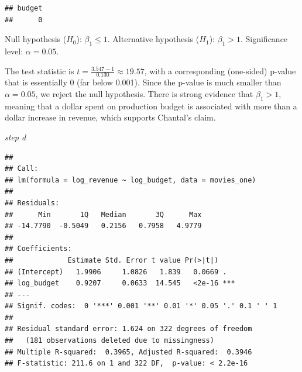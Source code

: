 \documentclass[
]{article}
\newenvironment{Shaded}{\begin{snugshade}}{\end{snugshade}}
\newcommand{\AttributeTok}[1]{\textcolor[rgb]{0.13,0.29,0.53}{#1}}
\newcommand{\CommentTok}[1]{\textcolor[rgb]{0.56,0.35,0.01}{\textit{#1}}}
\newcommand{\ConstantTok}[1]{\textcolor[rgb]{0.56,0.35,0.01}{#1}}
\newcommand{\DecValTok}[1]{\textcolor[rgb]{0.00,0.00,0.81}{#1}}
\newcommand{\FunctionTok}[1]{\textcolor[rgb]{0.13,0.29,0.53}{\textbf{#1}}}
\newcommand{\NormalTok}[1]{#1}
\newcommand{\OtherTok}[1]{\textcolor[rgb]{0.56,0.35,0.01}{#1}}
\newcommand{\SpecialCharTok}[1]{\textcolor[rgb]{0.81,0.36,0.00}{\textbf{#1}}}
\begin{document}
\begin{verbatim}
## budget 
##      0
\end{verbatim}

Null hypothesis (\(H_0\)): \(\beta_1 \leq 1\). Alternative hypothesis
(\(H_1\)): \(\beta_1 > 1\). Significance level: \(\alpha = 0.05\).

The test statistic is \(t = \frac{3.547 - 1}{0.130} \approx 19.57\),
with a corresponding (one-sided) p-value that is essentially 0 (far
below 0.001). Since the p-value is much smaller than \(\alpha = 0.05\),
we reject the null hypothesis. There is strong evidence that
\(\beta_1 > 1\), meaning that a dollar spent on production budget is
associated with more than a dollar increase in revenue, which supports
Chantal's claim.

\emph{step d}

\begin{Shaded}
\end{Shaded}

\begin{verbatim}
## 
## Call:
## lm(formula = log_revenue ~ log_budget, data = movies_one)
## 
## Residuals:
##      Min       1Q   Median       3Q      Max 
## -14.7790  -0.5049   0.2156   0.7958   4.9779 
## 
## Coefficients:
##             Estimate Std. Error t value Pr(>|t|)    
## (Intercept)   1.9906     1.0826   1.839   0.0669 .  
## log_budget    0.9207     0.0633  14.545   <2e-16 ***
## ---
## Signif. codes:  0 '***' 0.001 '**' 0.01 '*' 0.05 '.' 0.1 ' ' 1
## 
## Residual standard error: 1.624 on 322 degrees of freedom
##   (181 observations deleted due to missingness)
## Multiple R-squared:  0.3965, Adjusted R-squared:  0.3946 
## F-statistic: 211.6 on 1 and 322 DF,  p-value: < 2.2e-16
\end{verbatim}
\end{document}
